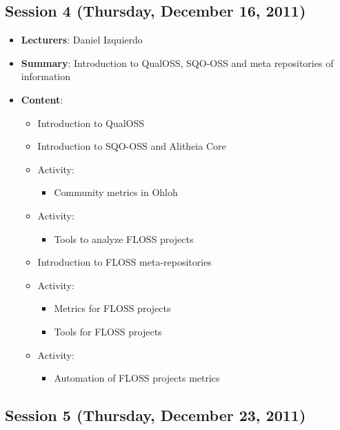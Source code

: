 \documentclass[a4paper]{article}
\begin{document}
\subsection{Session 4 (Thursday, December 16, 2011)}

\begin{itemize}
 \item \textbf{Lecturers}: Daniel Izquierdo
 \item \textbf{Summary}: Introduction to QualOSS, SQO-OSS and meta repositories of information
 \item \textbf{Content}:

 \begin{itemize}
      \item Introduction to QualOSS
      \item Introduction to SQO-OSS and Alitheia Core
      \item Activity:
        \begin{itemize}
          \item Community metrics in Ohloh
        \end{itemize}
      \item Activity:
        \begin{itemize}
          \item Tools to analyze FLOSS projects
        \end{itemize}
      \item Introduction to FLOSS meta-repositories
      \item Activity:
       \begin{itemize}
         \item Metrics for FLOSS projects
         \item Tools for FLOSS projects
       \end{itemize}
      \item Activity:
       \begin{itemize}
         \item Automation of FLOSS projects metrics
       \end{itemize}

 \end{itemize}

\end{itemize}


\subsection{Session 5 (Thursday, December 23, 2011)}
\end{document}
